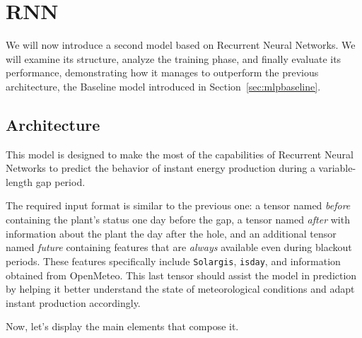 \section{RNN}\label{sec:rnnbasemodel}
We will now introduce a second model based on Recurrent Neural Networks.
We will examine its structure, analyze the training phase,
and finally evaluate its performance, demonstrating how it manages
to outperform the previous architecture, the Baseline model introduced in Section~\ref{sec:mlpbaseline}.


\subsection{Architecture}
This model is designed to make the most of the capabilities of
Recurrent Neural Networks to predict the behavior of instant
energy production during a variable-length gap period.

The required input format is similar to the previous one:
a tensor named \textit{before} containing the plant's status
one day before the gap, a tensor named \textit{after} with information
about the plant the day after the hole, and an additional tensor
named \textit{future} containing features that are \textit{always} available
even during blackout periods.
These features specifically include \verb|Solargis|, \verb|isday|,
and information obtained from OpenMeteo\cite{openmeteo}.
This last tensor should assist the model in prediction by helping
it better understand the state of meteorological conditions
and adapt instant production accordingly.

Now, let's display the main elements that compose it.

%
%

